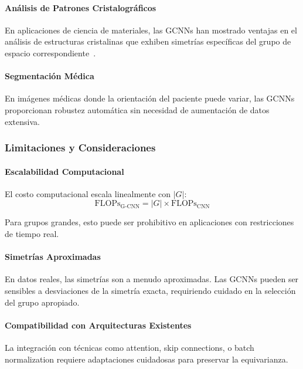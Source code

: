 \paragraph{Análisis de Patrones Cristalográficos}

En aplicaciones de ciencia de materiales, las \glspl{GCNN} han mostrado ventajas en el análisis de estructuras cristalinas que exhiben simetrías específicas del grupo de espacio correspondiente~\citep{weiler2018learningsteerable}.

\paragraph{Segmentación Médica}

En imágenes médicas donde la orientación del paciente puede variar, las \glspl{GCNN} proporcionan robustez automática sin necesidad de aumentación de datos extensiva.

\subsubsection{Limitaciones y Consideraciones}

\paragraph{Escalabilidad Computacional}

El costo computacional escala linealmente con $|G|$:
\begin{equation}
\text{FLOPs}_{\text{G-CNN}} = |G| \times \text{FLOPs}_{\text{CNN}}
\end{equation}

Para grupos grandes, esto puede ser prohibitivo en aplicaciones con restricciones de tiempo real.

\paragraph{Simetrías Aproximadas}

En datos reales, las simetrías son a menudo aproximadas. Las \glspl{GCNN} pueden ser sensibles a desviaciones de la simetría exacta, requiriendo cuidado en la selección del grupo apropiado.

\paragraph{Compatibilidad con Arquitecturas Existentes}

La integración con técnicas como attention, skip connections, o batch normalization requiere adaptaciones cuidadosas para preservar la equivarianza.

